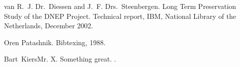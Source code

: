 \newcommand{\noopsort}[1]{} \newcommand{\singleletter}[1]{#1} 
\begin{thebibliography}{1}

van R.~J. Dr.~Diessen and J.~F. Drs.~Steenbergen.
\newblock Long {T}erm {P}reservation {S}tudy of the {DNEP} {P}roject.
\newblock Technical report, IBM, National Library of the Netherlands, December 2002.

Oren Patashnik.
\newblock Bibtexing, 1988.

Bart~KiersMr. X.
\newblock Something great.
.

\end{thebibliography}
